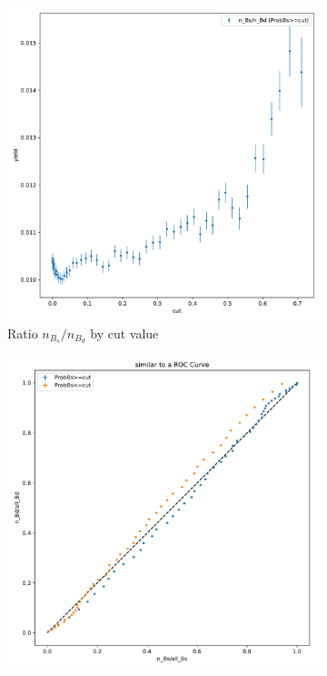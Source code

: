 \begin{figure}
    \centering
    \begin{subfigure}{0.5\textwidth}
        \centering
        \includegraphics[width=\textwidth]{images/data_ratio.pdf}
        \caption{Ratio $n_{B_s}/n_{B_d}$ by cut value}
        \label{fig:data_ratio}
    \end{subfigure}%
    \begin{subfigure}{0.5\textwidth}
        \centering
        \includegraphics[width=\textwidth]{images/data_roc.pdf}

\end{subfigure}
\end{figure}
